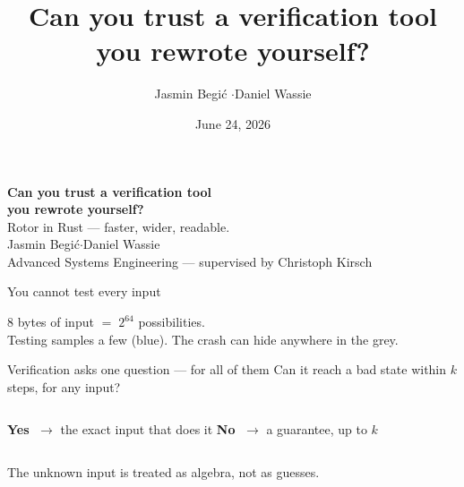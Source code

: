 \documentclass[aspectratio=169]{beamer}
\title{Can you trust a verification tool you rewrote yourself?}
\author{Jasmin Begi\'{c} \quad$\cdot$\quad Daniel Wassie}
\institute{Advanced Systems Engineering --- University of Salzburg}
\date{June 24, 2026}
\newcommand{\lab}[1]{{\footnotesize\color{ink!65}#1}}
\begin{document}
{
\begin{frame}
  \vfill
  \centering
  {\fontsize{25}{29}\selectfont\textbf{\textcolor{paper}{Can you trust a verification tool}}}\\[3pt]
  {\fontsize{25}{29}\selectfont\textbf{\textcolor{paper}{you rewrote }\textcolor{accent}{yourself}\textcolor{paper}{?}}}\\[1.4em]
  {\normalsize\color{faint}Rotor in Rust --- faster, wider, readable.}\\[2.2em]
  {\small\textcolor{paper}{Jasmin Begi\'{c}}\quad$\cdot$\quad\textcolor{paper}{Daniel Wassie}}\\[0.4em]
  {\footnotesize\color{faint}Advanced Systems Engineering --- supervised by Christoph Kirsch}
  \vfill
\end{frame}}

\begin{frame}{You cannot test every input}
  \vfill
  \centering
  \vfill
  {\large 8 bytes of input $=\;2^{64}$ possibilities.}\\[4pt]
  \lab{Testing samples a few (\textcolor{accent}{blue}). The crash can hide
       anywhere in the grey.}
  \vfill
\end{frame}

\begin{frame}{Verification asks one question --- for all of them}
  \vfill
  \centering
  {\large Can it reach a bad state within $k$ steps, for \alert{any} input?}
  \vfill
  \begin{columns}[T]
    \centering
      \textbf{Yes} $\;\rightarrow$ the exact input that does it
    \centering
      \textbf{No} $\;\rightarrow$ a guarantee, up to $k$
  \end{columns}
  \vfill
  \lab{The unknown input is treated as algebra, not as guesses.}
\end{frame}
\end{document}
